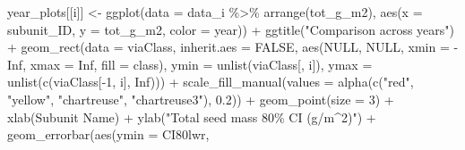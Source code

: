 \documentclass[
]{article}
\newenvironment{Shaded}{\begin{snugshade}}{\end{snugshade}}
\newcommand{\AttributeTok}[1]{\textcolor[rgb]{0.77,0.63,0.00}{#1}}
\newcommand{\ConstantTok}[1]{\textcolor[rgb]{0.00,0.00,0.00}{#1}}
\newcommand{\DecValTok}[1]{\textcolor[rgb]{0.00,0.00,0.81}{#1}}
\newcommand{\FloatTok}[1]{\textcolor[rgb]{0.00,0.00,0.81}{#1}}
\newcommand{\FunctionTok}[1]{\textcolor[rgb]{0.00,0.00,0.00}{#1}}
\newcommand{\NormalTok}[1]{#1}
\newcommand{\OtherTok}[1]{\textcolor[rgb]{0.56,0.35,0.01}{#1}}
\newcommand{\SpecialCharTok}[1]{\textcolor[rgb]{0.00,0.00,0.00}{#1}}
\newcommand{\StringTok}[1]{\textcolor[rgb]{0.31,0.60,0.02}{#1}}
\begin{document}
\begin{Shaded}
\begin{Highlighting}[]
\NormalTok{    year\_plots[[i]] }\OtherTok{\textless{}{-}}
                 \FunctionTok{ggplot}\NormalTok{(}\AttributeTok{data =}\NormalTok{ data\_i }\SpecialCharTok{\%\textgreater{}\%} \FunctionTok{arrange}\NormalTok{(tot\_g\_m2),}
                        \FunctionTok{aes}\NormalTok{(}\AttributeTok{x =}\NormalTok{ subunit\_ID,}
                            \AttributeTok{y =}\NormalTok{ tot\_g\_m2,}
                            \AttributeTok{color =}\NormalTok{ year)) }\SpecialCharTok{+}
                 \FunctionTok{ggtitle}\NormalTok{(}\StringTok{"Comparison across years"}\NormalTok{) }\SpecialCharTok{+}
                 \FunctionTok{geom\_rect}\NormalTok{(}\AttributeTok{data =}\NormalTok{ viaClass,}
                           \AttributeTok{inherit.aes =} \ConstantTok{FALSE}\NormalTok{,}
                           \FunctionTok{aes}\NormalTok{(}\ConstantTok{NULL}\NormalTok{,}
                               \ConstantTok{NULL}\NormalTok{,}
                               \AttributeTok{xmin =} \SpecialCharTok{{-}}\ConstantTok{Inf}\NormalTok{,}
                               \AttributeTok{xmax =} \ConstantTok{Inf}\NormalTok{,}
                               \AttributeTok{fill =}\NormalTok{ class),}
                           \AttributeTok{ymin =} \FunctionTok{unlist}\NormalTok{(viaClass[, i]),}
                           \AttributeTok{ymax =} \FunctionTok{unlist}\NormalTok{(}\FunctionTok{c}\NormalTok{(viaClass[}\SpecialCharTok{{-}}\DecValTok{1}\NormalTok{, i], }\ConstantTok{Inf}\NormalTok{))) }\SpecialCharTok{+}
                 \FunctionTok{scale\_fill\_manual}\NormalTok{(}\AttributeTok{values =} \FunctionTok{alpha}\NormalTok{(}\FunctionTok{c}\NormalTok{(}\StringTok{"red"}\NormalTok{,}
                                                    \StringTok{"yellow"}\NormalTok{,}
                                                    \StringTok{"chartreuse"}\NormalTok{,}
                                                    \StringTok{"chartreuse3"}\NormalTok{),}
                                                  \FloatTok{0.2}\NormalTok{)) }\SpecialCharTok{+}
                 \FunctionTok{geom\_point}\NormalTok{(}\AttributeTok{size =} \DecValTok{3}\NormalTok{) }\SpecialCharTok{+}
                 \FunctionTok{xlab}\NormalTok{(}\StringTok{\textquotesingle{}Subunit Name\textquotesingle{}}\NormalTok{) }\SpecialCharTok{+}
                 \FunctionTok{ylab}\NormalTok{(}\StringTok{"Total seed mass 80\% CI (g/m\^{}2)"}\NormalTok{) }\SpecialCharTok{+}
                 \FunctionTok{geom\_errorbar}\NormalTok{(}\FunctionTok{aes}\NormalTok{(}\AttributeTok{ymin =}\NormalTok{ CI80lwr,}

\end{Highlighting}
\end{Shaded}
\end{document}
